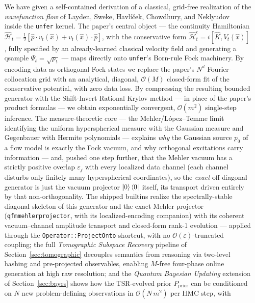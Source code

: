 \documentclass[11pt, a4paper]{article}
\newcommand{\Hgen}{\hat{\mathcal{H}}}
\newcommand{\Kop}{\hat{K}}
\begin{document}
We have given a self-contained derivation of a classical, grid-free realization
of the \emph{wavefunction flow} of Layden, Sweke, Havl\'i\v{c}ek, Chowdhury, and
Neklyudov~\cite{Layden2025} inside the \texttt{unfer} kernel. The paper's
central object --- the continuity Hamiltonian
$\Hgen_t=\tfrac12[\hat p\cdot v_t(\hat x)+v_t(\hat x)\cdot\hat p]$, with the
conservative form $\Hgen_t^c=i[\Kop,V_t(\hat x)]$, fully specified by an
already-learned classical velocity field and generating a qsample
$\Psi_t=\sqrt{p_t}$ --- maps directly onto \texttt{unfer}'s Born-rule Fock
machinery. By encoding data as orthogonal Fock states we replace the paper's
$N^d$ Fourier-collocation grid with an analytical, diagonal,
$\mathcal{O}(M)$ closed-form fit of the conservative potential, with zero data
loss. By compressing the resulting bounded generator with the Shift-Invert
Rational Krylov method --- in place of the paper's product formulas --- we
obtain exponentially convergent, $\mathcal{O}(m^2)$ single-step inference. The
measure-theoretic core --- the Mehler/L\'opez--Temme limit identifying the
uniform hyperspherical measure with the Gaussian measure and Gegenbauer with
Hermite polynomials --- explains \emph{why} the Gaussian source $p_0$ of a flow
model is exactly the Fock vacuum, and why orthogonal excitations carry
information --- and, pushed one step further, that the Mehler vacuum has a
strictly positive overlap $\varepsilon_j$ with every localized data channel
(each channel disturbs only finitely many hyperspherical coordinates), so
the \emph{exact} off-diagonal generator is just the vacuum projector
$\ket{0}\bra{0}$ itself, its transport driven entirely by that
non-orthogonality. The shipped builtins realize the spectrally-stable
diagonal skeleton of this generator and the exact Mehler projector
(\texttt{qfm\textunderscore mehler\textunderscore projector}, with its
localized-encoding companion) with its coherent vacuum--channel amplitude
transport and closed-form rank-1 evolution --- applied through the
\texttt{Operator::ProjectOnto} shortcut, with no
$\mathcal{O}(\varepsilon)$-truncated coupling; the full \emph{Tomographic
Subspace Recovery} pipeline of Section~\ref{sec:tomographic} decouples
semantics from reasoning via two-level hashing and pre-projected observables,
enabling $M$-free four-phase online generation at high raw resolution; and the
\emph{Quantum Bayesian Updating} extension of Section~\ref{sec:bayes} shows how
the TSR-evolved prior $P_{\mathrm{prior}}$ can be conditioned on $N$ new
problem-defining observations in $\mathcal{O}(N\,m^2)$ per HMC step, with
\end{document}

